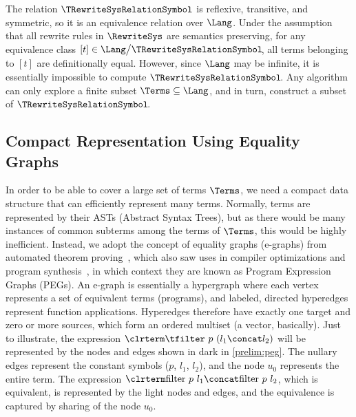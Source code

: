 The relation $\TRewriteSysRelationSymbol$ is reflexive, transitive, and symmetric,
so it is an equivalence relation over $\Lang$.
Under the assumption that all rewrite rules in $\RewriteSys$ are semantics preserving, for any equivalence class $[t] \in \Lang \big/ {\TRewriteSysRelationSymbol}\!$, all terms belonging to $[t]$ are definitionally equal.
However, since $\Lang$ may be infinite, it is essentially impossible to compute $\TRewriteSysRelationSymbol\!$.
Any algorithm can only explore a finite subset $\Terms \subseteq \Lang$, and in turn,
construct a subset of $\TRewriteSysRelationSymbol\!$.

\subsection{Compact Representation Using Equality Graphs}
\label{screening:representation}

In order to be able to cover a large set of terms $\Terms$, we need a
compact data structure that can efficiently represent many terms.
Normally, terms are represented by their ASTs
(Abstract Syntax Trees), but as there would
be many instances of common subterms among the terms of $\Terms$, 
this would be highly inefficient.
Instead, we adopt the concept of equality graphs (e-graphs) from automated theorem proving~\cite{JACM2005:Detlefs},
which also saw uses in compiler optimizations and program synthesis~\cite{POPL2009:Tate,herbie,PLDI2020:Nandi}, in which context they are known as Program Expression Graphs (PEGs).
An e-graph is essentially a hypergraph where each vertex represents a set
of equivalent terms (programs), and labeled, directed hyperedges
represent function applications.
Hyperedges therefore have exactly one target and zero or more sources,
which form an ordered multiset (a vector, basically).
Just to illustrate, the expression
$\clrterm\tfilter~p~(l_1 \concat l_2)$
will be represented by the nodes and edges shown in dark in \autoref{prelim:peg}.
The nullary edges represent the constant symbols ($p$, $l_1$, $l_2$), and the node $u_0$ represents the entire term.
The expression 
$\clrterm\textrm{filter}~p~l_1 \concat \textrm{filter}~p~l_2$, which is equivalent, is represented by the light nodes and edges, and the equivalence is captured by sharing of the node $u_0$.

\begin{comment}
\[
\begin{array}{l}
    \langle \rangle \xrightarrow{p} u_1 \quad
    \langle \rangle \xrightarrow{l_1} u_2 \quad
    \langle \rangle \xrightarrow{l_2} u_3 \qquad
    \langle u_2, u_3 \rangle \xrightarrow{\concat} u_4 \quad
    \langle u_1, u_4 \rangle \xrightarrow{\textrm{filter}} u_5
\end{array}
\]
\end{comment}

